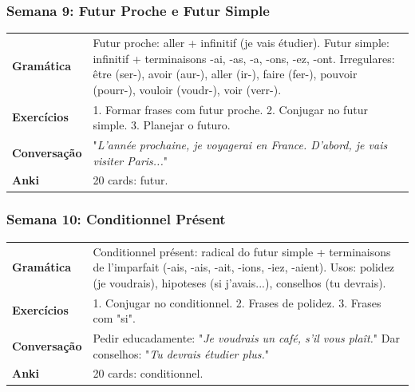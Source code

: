 \documentclass[a4paper,12pt]{article}
\begin{document}
\subsubsection*{Semana 9: Futur Proche e Futur Simple}
\begin{tabularx}{\linewidth}{>{\bfseries}l L}
    Gramática & Futur proche: aller + infinitif (je vais étudier). Futur simple: infinitif + terminaisons -ai, -as, -a, -ons, -ez, -ont. Irregulares: être (ser-), avoir (aur-), aller (ir-), faire (fer-), pouvoir (pourr-), vouloir (voudr-), voir (verr-). \\
    Exercícios & 1. Formar frases com futur proche. 2. Conjugar no futur simple. 3. Planejar o futuro. \\
    Conversação & "\emph{L'année prochaine, je voyagerai en France. D'abord, je vais visiter Paris...}" \\
    Anki & 20 cards: futur. \\
\end{tabularx}

\subsubsection*{Semana 10: Conditionnel Présent}
\begin{tabularx}{\linewidth}{>{\bfseries}l L}
    Gramática & Conditionnel présent: radical do futur simple + terminaisons de l'imparfait (-ais, -ais, -ait, -ions, -iez, -aient). Usos: polidez (je voudrais), hipoteses (si j'avais...), conselhos (tu devrais). \\
    Exercícios & 1. Conjugar no conditionnel. 2. Frases de polidez. 3. Frases com "si". \\
    Conversação & Pedir educadamente: "\emph{Je voudrais un café, s'il vous plaît.}" Dar conselhos: "\emph{Tu devrais étudier plus.}" \\
    Anki & 20 cards: conditionnel. \\
\end{tabularx}
\end{document}
